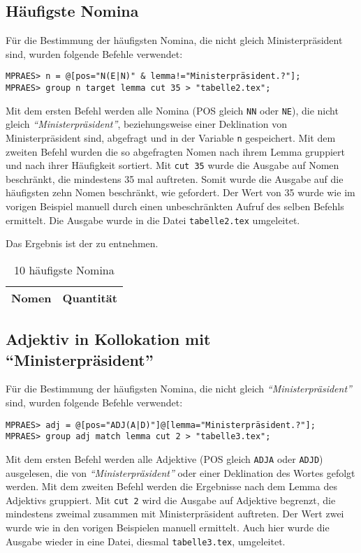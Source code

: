 \documentclass[%
	type=document,%
  	style=article,%
  	media=print,
  	pages=oneside,%
  	prefixLecturer=Dozenten:,
  	author=multiple,
]{unihildesheim} %
\begin{document}
\subsection{Häufigste Nomina}
Für die Bestimmung der häufigsten Nomina, die nicht gleich Ministerpräsident
sind, wurden folgende Befehle verwendet:
\begin{Verbatim}[frame=single,label=CQP,commandchars=\\\{\}]
MPRAES> n = @[pos="N(E|N)" & lemma!="Ministerpräsident.?"];
MPRAES> group n target lemma cut 35 > "tabelle2.tex";
\end{Verbatim}

Mit dem ersten Befehl werden alle Nomina (POS gleich \texttt{NN} oder
\texttt{NE}), die nicht gleich \textit{"`Ministerpräsident"'}, beziehungsweise einer
Deklination von Ministerpräsident sind, abgefragt und in der Variable \texttt{n}
gespeichert. Mit dem zweiten Befehl wurden die so abgefragten Nomen nach ihrem Lemma gruppiert und
nach ihrer Häufigkeit sortiert. Mit \texttt{cut 35} wurde die Ausgabe auf Nomen
beschränkt, die mindestens 35 mal auftreten. Somit wurde die Ausgabe auf die
häufigsten zehn Nomen beschränkt, wie gefordert. Der Wert von 35 wurde wie im
vorigen Beispiel manuell durch einen unbeschränkten Aufruf des selben
Befehls ermittelt. Die Ausgabe wurde in die Datei \texttt{tabelle2.tex}
umgeleitet.

Das Ergebnis ist der  zu entnehmen.
\begin{table}[htpb]\label{t}
	\center
	\begin{tabularx}{0.35\textwidth}{lr}
		\toprule
		\textbf{Nomen} & \textbf{Quantität}\\
		\midrule
		
		\bottomrule
	\end{tabularx}
	\caption{10 häufigste Nomina}
	\label{tab:nomina}
\end{table}

\subsection{Adjektiv in Kollokation mit "`Ministerpräsident"'}
Für die Bestimmung der häufigsten Nomina, die nicht gleich
\textit{"`Ministerpräsident"'} sind, wurden folgende Befehle verwendet:
\begin{Verbatim}[frame=single,label=CQP,commandchars=\\\{\}]
MPRAES> adj = @[pos="ADJ(A|D)"]@[lemma="Ministerpräsident.?"];
MPRAES> group adj match lemma cut 2 > "tabelle3.tex";
\end{Verbatim}
Mit dem ersten Befehl werden alle Adjektive (POS gleich \texttt{ADJA} oder
\texttt{ADJD}) ausgelesen, die von \textit{"`Ministerpräsident"'} oder einer
Deklination des Wortes gefolgt werden. Mit dem zweiten Befehl werden die
Ergebnisse nach dem Lemma des Adjektivs gruppiert. Mit \texttt{cut 2} wird die Ausgabe auf Adjektive begrenzt,
die mindestens zweimal zusammen mit Ministerpräsident auftreten. Der Wert zwei
wurde wie in den vorigen Beispielen manuell ermittelt. Auch hier wurde die Ausgabe
wieder in eine Datei, diesmal \texttt{tabelle3.tex}, umgeleitet. 
\end{document}
